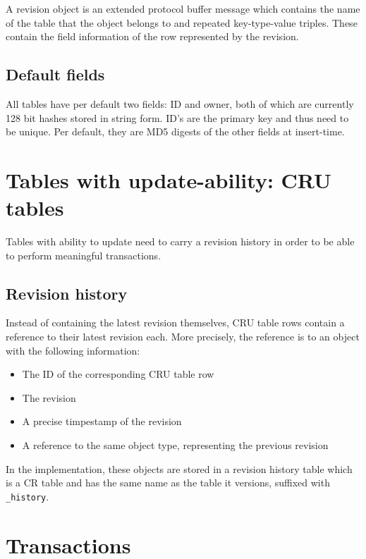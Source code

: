 \documentclass{article}
\begin{document}
A revision object is an extended protocol buffer message which contains the
name of the table that the object belongs to and repeated key-type-value
triples. These contain the field information of the row represented by the
revision.

\subsection{Default fields}

All tables have per default two fields: ID and owner, both of which are
currently 128 bit hashes stored in string form. ID's are the primary key and
thus need to be unique. Per default, they are MD5 digests of the other fields
at insert-time.

\section{Tables with update-ability: CRU tables}

Tables with ability to update need to carry a revision history in order to be
able to perform meaningful transactions.

\subsection{Revision history}

Instead of containing the latest revision themselves, CRU table rows contain
a reference to their latest revision each. More precisely, the reference is to
an object with the following information:

\begin{itemize} \itemsep0em
  \item The ID of the corresponding CRU table row
  \item The revision
  \item A precise timpestamp of the revision
  \item A reference to the same object type, representing the previous revision
\end{itemize}


In the implementation, these objects are stored in a revision history table
which is a CR table and has the same name as the table it versions, suffixed
with {\tt \_history}.

\section{Transactions}\label{transactions}
\end{document}
